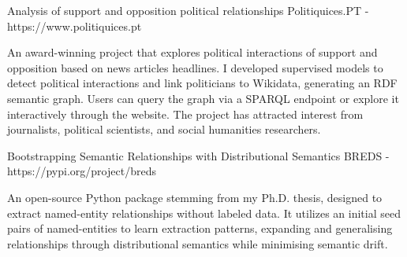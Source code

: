 
\begin{cventries}
  \cventry
    {Analysis of support and opposition political relationships} %
	{Politiquices.PT - https://www.politiquices.pt} %
    {} %
    {} %
    {
      \begin{cvitems} %
		  \item {An award-winning project that explores political interactions of support and opposition based on news articles headlines. I developed supervised models to detect political interactions and link politicians to Wikidata, generating an RDF semantic graph. Users can query the graph via a SPARQL endpoint or explore it interactively through the website. The project has attracted interest from journalists, political scientists, and social humanities researchers.}		  
      \end{cvitems}
    }
\end{cventries}

\begin{cventries}
 \cventry
   {Bootstrapping Semantic Relationships with Distributional Semantics} %
   {BREDS - https://pypi.org/project/breds} %
   {} %
   {} %
   {
     \begin{cvitems} %
		\item {An open-source Python package stemming from my Ph.D. thesis, designed to extract named-entity relationships without labeled data. It utilizes an initial seed pairs of named-entities to learn extraction patterns, expanding and generalising relationships through distributional semantics while minimising semantic drift.}
     \end{cvitems}
   }
\end{cventries}

